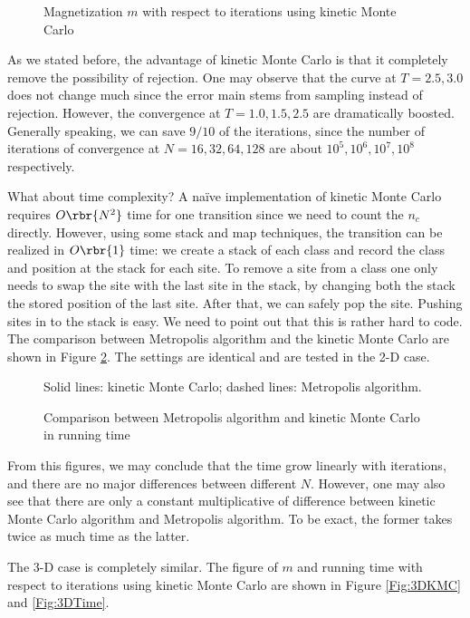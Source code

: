 \documentclass[english, nochinese]{pnote}
\begin{document}
\begin{figure}[htbp]
\centering
\scalebox{0.725}{}
\caption{Magnetization $m$ with respect to iterations using kinetic Monte Carlo}
\label{Fig:KMC}
\end{figure}

As we stated before, the advantage of kinetic Monte Carlo is that it completely remove the possibility of rejection. One may observe that the curve at $ T = 2.5, 3.0 $ does not change much since the error main stems from sampling instead of rejection. However, the convergence at $ T = 1.0, 1.5, 2.5 $ are dramatically boosted. Generally speaking, we can save $ 9 / 10 $ of the iterations, since the number of iterations of convergence at $ N = 16, 32, 64, 128 $ are about $ 10^5, 10^6, 10^7, 10^8 $ respectively.

What about time complexity? A na\"ive implementation of kinetic Monte Carlo requires $ O \rbr{N^2} $ time for one transition since we need to count the $n_c$ directly. However, using some stack and map techniques, the transition can be realized in $ O \rbr{1} $ time: we create a stack of each class and record the class and position at the stack for each site. To remove a site from a class one only needs to swap the site with the last site in the stack, by changing both the stack the stored position of the last site. After that, we can safely pop the site. Pushing sites in to the stack is easy. We need to point out that this is rather hard to code. The comparison between Metropolis algorithm and the kinetic Monte Carlo are shown in Figure \ref{Fig:MetroKMC}. The settings are identical and are tested in the 2-D case.

\begin{figure}[htbp]
{
\centering
\scalebox{0.725}{}
\caption{Comparison between Metropolis algorithm and kinetic Monte Carlo in running time}
\label{Fig:MetroKMC}
}
{
\footnotesize Solid lines: kinetic Monte Carlo; dashed lines: Metropolis algorithm.
}
\end{figure}

From this figures, we may conclude that the time grow linearly with iterations, and there are no major differences between different $N$. However, one may also see that there are only a constant multiplicative of difference between kinetic Monte Carlo algorithm and Metropolis algorithm. To be exact, the former takes twice as much time as the latter.

The 3-D case is completely similar. The figure of $m$ and running time with respect to iterations using kinetic Monte Carlo are shown in Figure \ref{Fig:3DKMC} and \ref{Fig:3DTime}.
\end{document}
